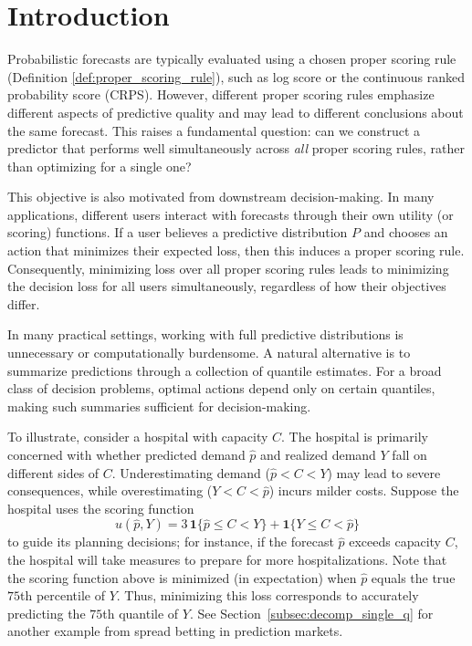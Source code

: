
\section{Introduction} \label{sec:intro}

Probabilistic forecasts are typically evaluated using a chosen proper scoring rule (Definition \ref{def:proper_scoring_rule}), such as log score or the continuous ranked probability score (CRPS). However, different proper scoring rules emphasize different aspects of predictive quality and may lead to different conclusions about the same forecast. This raises a fundamental question: can we construct a predictor that performs well simultaneously across \emph{all} proper scoring rules, rather than optimizing for a single one?

This objective is also motivated from downstream decision-making. In many applications, different users interact with forecasts through their own utility (or scoring) functions. If a user believes a predictive distribution $P$ and chooses an action that minimizes their expected loss, then this induces a proper scoring rule. Consequently, minimizing loss over all proper scoring rules leads to minimizing the decision loss for all users simultaneously, regardless of how their objectives differ. %

In many practical settings, working with full predictive distributions is unnecessary or computationally burdensome. A natural alternative is to summarize predictions through a collection of quantile estimates. For a broad class of decision problems, optimal actions depend only on certain quantiles, making such summaries sufficient for decision-making.

To illustrate, consider a hospital with capacity $C$. The hospital is primarily concerned with whether predicted demand $\hat{p}$ and realized demand $Y$ fall on different sides of $C$. Underestimating demand ($\hat{p} < C < Y$) may lead to severe consequences, while overestimating ($Y < C < \hat{p}$) incurs milder costs. Suppose the hospital uses the scoring function
\[
u(\hat{p}, Y) = 3\,\mathbf{1}\{\hat{p} \leq C < Y\} + \mathbf{1}\{Y \leq C < \hat{p}\}
\]
to guide its planning decisions; for instance, if the forecast $\hat{p}$ exceeds capacity $C$, the hospital will take measures to prepare for more hospitalizations. Note that the scoring function above is minimized (in expectation) when $\hat{p}$ equals the true $75$th percentile of $Y$. Thus, minimizing this loss corresponds to accurately predicting the $75$th quantile of $Y$. See Section~\ref{subsec:decomp_single_q} for another example from spread betting in prediction markets.





